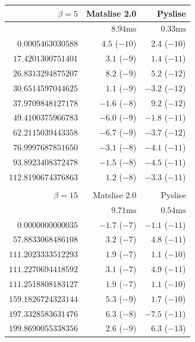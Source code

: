 \begin{table}
  \begin{center}
    \begin{tabular}[]{rrr}
      \toprule
      $\beta=5$           & Matslise 2.0     & Pyslise         \\
      \midrule
                          & $8.94\text{ms}$  & $0.33\text{ms}$ \\
      $0.0005463030588$   & $4.5$ ($-10$)    & $2.4$ ($-10$)   \\
      $17.4201300751401$  & $3.1$ ($-9$)     & $1.4$ ($-11$)   \\
      $26.8313294875207$  & $8.2$ ($-9$)     & $5.2$ ($-12$)   \\
      $30.6514597044625$  & $1.1$ ($-9$)     & $-3.2$ ($-12$)  \\
      $37.9709848127178$  & $-1.6$ ($-8$)    & $9.2$ ($-12$)   \\
      $49.4100375966783$  & $-6.0$ ($-9$)    & $-1.8$ ($-11$)  \\
      $62.2115039443358$  & $-6.7$ ($-9$)    & $-3.7$ ($-12$)  \\
      $76.9997687851650$  & $-3.1$ ($-8$)    & $-4.1$ ($-11$)  \\
      $93.8923408372478$  & $-1.5$ ($-8$)    & $-4.5$ ($-11$)  \\
      $112.8190674376863$ & $1.2$ ($-8$)     & $-3.3$ ($-11$)  \\
                          &                  &                 \\
      \bottomrule
      \toprule
      $\beta=15$          & Matslise 2.0     & Pyslise         \\
      \midrule
                          & $9.71\text{ms}$  & $0.54\text{ms}$ \\
      $0.0000000000035$   & $-1.7$ ($-7$)    & $-1.1$ ($-11$)  \\
      $57.8833068486108$  & $3.2$ ($-7$)     & $4.8$ ($-11$)   \\
      $111.2023333512293$ & $1.9$ ($-7$)     & $1.1$ ($-10$)   \\
      $111.2270694418592$ & $3.1$ ($-7$)     & $4.9$ ($-11$)   \\
      $111.2518808183127$ & $1.9$ ($-7$)     & $1.1$ ($-10$)   \\
      $159.1826724323144$ & $5.3$ ($-9$)     & $1.7$ ($-10$)   \\
      $197.3328583631476$ & $6.3$ ($-8$)     & $-7.5$ ($-11$)  \\
      $199.8690055338356$ & $2.6$ ($-9$)     & $6.3$ ($-13$)   \\

\end{tabular}
\end{center}
\end{table}
